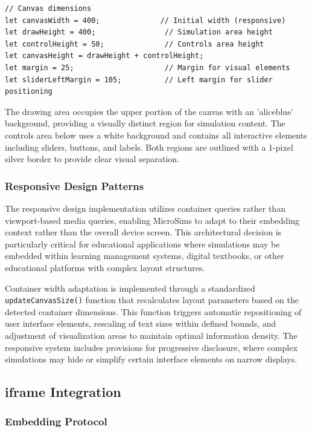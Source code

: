 \begin{lstlisting}[caption={Standard MicroSim Canvas Structure}]
// Canvas dimensions
let canvasWidth = 400;              // Initial width (responsive)
let drawHeight = 400;                // Simulation area height
let controlHeight = 50;              // Controls area height
let canvasHeight = drawHeight + controlHeight;
let margin = 25;                     // Margin for visual elements
let sliderLeftMargin = 105;          // Left margin for slider positioning
\end{lstlisting}

The drawing area occupies the upper portion of the canvas with an 'aliceblue' background, providing a visually distinct region for simulation content. The controls area below uses a white background and contains all interactive elements including sliders, buttons, and labels. Both regions are outlined with a 1-pixel silver border to provide clear visual separation.

\subsubsection{Responsive Design Patterns}

The responsive design implementation utilizes container queries rather than viewport-based media queries, enabling MicroSims to adapt to their embedding context rather than the overall device screen. This architectural decision is particularly critical for educational applications where simulations may be embedded within learning management systems, digital textbooks, or other educational platforms with complex layout structures.

Container width adaptation is implemented through a standardized \texttt{updateCanvasSize()} function that recalculates layout parameters based on the detected container dimensions. This function triggers automatic repositioning of user interface elements, rescaling of text sizes within defined bounds, and adjustment of visualization areas to maintain optimal information density. The responsive system includes provisions for progressive disclosure, where complex simulations may hide or simplify certain interface elements on narrow displays.

\subsection{iframe Integration}

\subsubsection{Embedding Protocol}

